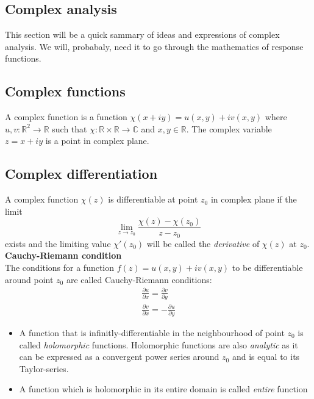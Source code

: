 \documentclass[jcp,groupaddress]{revtex4-1}
\newcommand{\eq}{\begin{equation}}
\newcommand{\qe}{\end{equation}}
\begin{document}
\begin{appendices}
\section{Complex analysis}

This section will be a quick sammary of ideas and expressions of complex analysis. We will, probabaly, need it to go through the mathematics of response functions.
\subsection{Complex functions}
 A complex function is a function $\chi(x+iy) = u(x,y) + i v(x,y)$ where $u, v: \mathbb{R}^{2}\rightarrow \mathbb{R}$ such that $\chi: \mathbb{R}\times\mathbb{R}\rightarrow \mathbb{C} $ and $x, y \in \mathbb{R}$. The complex variable $z = x +iy$ is a point in complex plane.  
\subsection{Complex differentiation}
A complex function $\chi(z)$ is differentiable at point $z_{0}$ in complex plane if the limit
\eq
\lim_{z \to z_{0}}\frac{\chi(z)-\chi(z_{0})}{z-z_{0}}
\qe
exists and the limiting value $\chi'(z_{0})$ will be called the \emph{derivative} of $\chi(z)$ at $z_{0}$.\\

\textbf{Cauchy-Riemann condition}\\
The conditions for a function $f(z) = u(x,y) + i v(x, y)$ to be differentiable around point $z_{0}$ are called Cauchy-Riemann conditions: 
\begin{eqnarray}
 \frac{\partial u}{\partial x} =  \frac{\partial v }{\partial y } \\
 \frac{\partial{v}}{\partial{x}}= -\frac{\partial{u}}{\partial{y}}
\end{eqnarray}
\begin{itemize}
\item A function that is infinitly-differentiable in the neighbourhood of point $z_{0}$ is called \emph{holomorphic} functions. Holomorphic functions are also \emph{analytic} as it can be expressed as a convergent power series around $z_{0}$ and is equal to its Taylor-series. 
\item A function which is holomorphic in its entire domain is called \emph{entire} function
\end{itemize}

\end{appendices}
\end{document}
